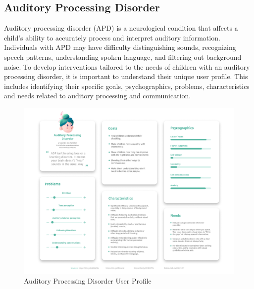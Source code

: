 \subsection{Auditory Processing Disorder}
Auditory processing disorder (APD) is a neurological condition that affects a child's ability to accurately process and interpret auditory information. Individuals with APD may have difficulty distinguishing sounds, recognizing speech patterns, understanding spoken language, and filtering out background noise. To develop interventions tailored to the needs of children with an auditory processing disorder, it is important to understand their unique user profile. This includes identifying their specific goals, psychographics, problems, characteristics and needs related to auditory processing and communication.

\begin{figure}[H]
    \centering
    \includegraphics[width=0.8\linewidth]{Chapters/figma/Auditory Processing Disorder.png}
    \caption{Auditory Processing Disorder User Profile}
    \label{fig:APDUserProfile}
\end{figure}

